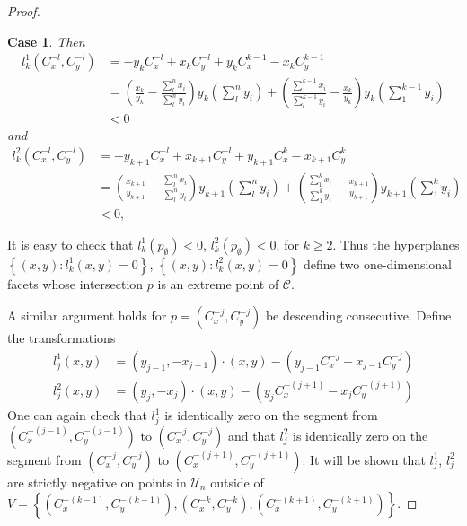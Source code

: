 \documentclass{article}
\theoremstyle{case}
\newtheorem{case}{Case}
\begin{document}
\begin{proof}
\begin{case}
\noindent Then
\begin{align*}
l_k^1\left( C_x^{-l}, C_y^{-l}\right) &= -y_kC_x^{-l} + x_kC_{y}^{-l} + y_kC_x^{k-1} - x_kC_y^{k-1} \\
&= \left( \frac{x_k}{y_k} - \frac{\sum_l^n x_i}{\sum_l^n y_i}\right)y_k \left( \sum_l^n y_i\right) + \left( \frac{\sum_1^{k-1} x_i}{\sum_l^{k-1}y_i} - \frac{x_k}{y_k}\right)y_k \left( \sum_1^{k-1}y_i\right) \\
&< 0
\end{align*}
and
\begin{align*}
l_k^2\left( C_x^{-l}, C_y^{-l}\right) &= -y_{k+1}C_x^{-l} + x_{k+1}C_y^{-l} + y_{k+1}C_x^k - x_{k+1}C_y^k \\
&= \left( \frac{x_{k+1}}{y_{k+1}} - \frac{\sum_l^n x_i}{\sum_l^n y_i}\right)y_{k+1}\left(\sum_l^n y_i\right) + \left( \frac{\sum_1^k x_i}{\sum_1^k y_i} - \frac{x_{k+1}}{y_{k+1}}\right)y_{k+1}\left(\sum_1^k y_i\right) \\
&< 0,
\end{align*}
\end{case}

\noindent It is easy to check that $l_k^1\left( p_{\emptyset}\right) <0$, $l_k^2\left( p_{\emptyset}\right) < 0$, for $k \geq 2$. Thus the hyperplanes $\left\lbrace \left( x,y\right) \colon l_k^1\left( x,y\right) = 0\right\rbrace$, $\left\lbrace \left( x,y\right) \colon l_k^2\left( x,y\right) = 0\right\rbrace$ define two one-dimensional facets whose intersection $p$ is an extreme point of $\mathcal{C}$.

\noindent A similar argument holds for $p = \left( C_x^{-j}, C_y^{-j}\right)$ be descending consecutive. Define the transformations
\begin{align*}
l_j^1\left( x,y\right) &= \left( y_{j-1}, -x_{j-1}\right) \cdot \left( x,y\right) - \left( y_{j-1}C_x^{-j} - x_{j-1}C_y^{-j}\right) \\
l_j^2\left( x,y\right) &= \left( y_j, -x_j\right) \cdot \left( x,y\right) - \left( y_jC_x^{-\left(j+1\right)} - x_jC_y^{-\left( j+1\right)}\right)
\end{align*}
One can again check that $l_j^1$ is identically zero on the segment from $\left( C_x^{-(j-1)}, C_y^{-(j-1)}\right)$ to $\left( C_x^{-j}, C_y^{-j}\right)$ and that $l_j^2$ is identically zero on the segment from  $\left( C_x^{-j}, C_y^{-j}\right)$ to $\left( C_x^{-(j+1)}, C_y^{-(j+1)}\right)$. It will be shown that $l_j^1$, $l_j^2$ are strictly negative on points in $\mathcal{U}_n$ outside of $V = \left\lbrace (C_x^{-(k-1)}, C_y^{-(k-1)}), (C_x^{-k}, C_y^{-k}), (C_x^{-(k+1)}, C_y^{-(k+1)})\right\rbrace$. 


\end{proof}
\end{document}
